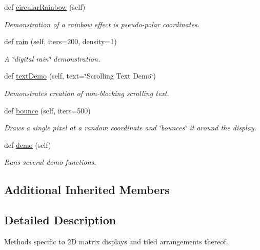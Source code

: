 \begin{DoxyCompactItemize}
def \hyperlink{classglowbit_1_1glowbitMatrix_adf29bdb4294bcf27ae560130b0fcae35}{circular\+Rainbow} (self)
\begin{DoxyCompactList}\small\item\em Demonstration of a rainbow effect is pseudo-\/polar coordinates. \end{DoxyCompactList}\item 
def \hyperlink{classglowbit_1_1glowbitMatrix_a088608e2586a76f09eb7312f2155f0b8}{rain} (self, iters=200, density=1)
\begin{DoxyCompactList}\small\item\em A \char`\"{}digital rain\char`\"{} demonstration. \end{DoxyCompactList}\item 
def \hyperlink{classglowbit_1_1glowbitMatrix_a6232220b12c86c7ec361cde374419ac4}{text\+Demo} (self, text=\char`\"{}Scrolling Text Demo\char`\"{})
\begin{DoxyCompactList}\small\item\em Demonstrates creation of non-\/blocking scrolling text. \end{DoxyCompactList}\item 
\mbox{\label{classglowbit_1_1glowbitMatrix_af24d7b883af9ce47fb66450da2a58155}} 
def \hyperlink{classglowbit_1_1glowbitMatrix_af24d7b883af9ce47fb66450da2a58155}{bounce} (self, iters=500)
\begin{DoxyCompactList}\small\item\em Draws a single pixel at a random coordinate and \char`\"{}bounces\char`\"{} it around the display. \end{DoxyCompactList}\item 
\mbox{\label{classglowbit_1_1glowbitMatrix_a2b32b49b418d50de484ef8487a77d082}} 
def \hyperlink{classglowbit_1_1glowbitMatrix_a2b32b49b418d50de484ef8487a77d082}{demo} (self)
\begin{DoxyCompactList}\small\item\em Runs several demo functions. \end{DoxyCompactList}\end{DoxyCompactItemize}
\subsection*{Additional Inherited Members}


\subsection{Detailed Description}
Methods specific to 2D matrix displays and tiled arrangements thereof. 

